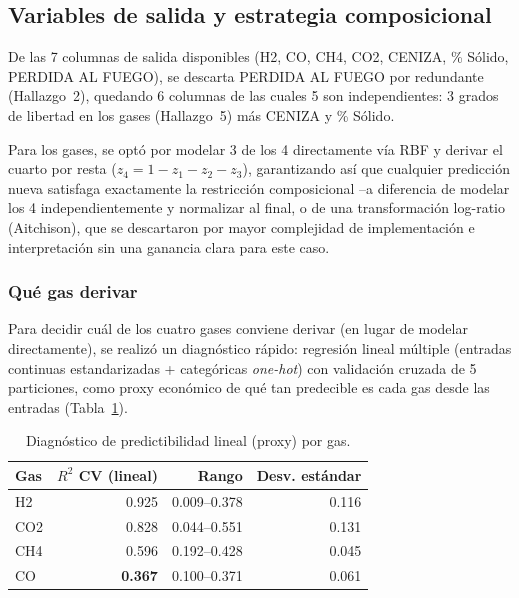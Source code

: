 \documentclass[11pt,a4paper]{article}
\begin{document}
\subsection{Variables de salida y estrategia composicional}
\label{subsec:composicional}

De las 7 columnas de salida disponibles (H2, CO, CH4, CO2, CENIZA, \%
S\'olido, PERDIDA AL FUEGO), se descarta PERDIDA AL FUEGO por redundante
(Hallazgo~2), quedando 6 columnas de las cuales 5 son independientes: 3
grados de libertad en los gases (Hallazgo~5) m\'as CENIZA y \% S\'olido.

Para los gases, se opt\'o por modelar 3 de los 4 directamente v\'ia RBF y
derivar el cuarto por resta ($z_4 = 1-z_1-z_2-z_3$), garantizando as\'i que
cualquier predicci\'on nueva satisfaga exactamente la restricci\'on
composicional --a diferencia de modelar los 4 independientemente y
normalizar al final, o de una transformaci\'on log-ratio (Aitchison), que
se descartaron por mayor complejidad de implementaci\'on e interpretaci\'on
sin una ganancia clara para este caso.

\subsubsection{Qu\'e gas derivar}

Para decidir cu\'al de los cuatro gases conviene derivar (en lugar de
modelar directamente), se realiz\'o un diagn\'ostico r\'apido: regresi\'on
lineal m\'ultiple (entradas continuas estandarizadas + categ\'oricas
\emph{one-hot}) con validaci\'on cruzada de 5 particiones, como proxy
econ\'omico de qu\'e tan predecible es cada gas desde las entradas
(Tabla~\ref{tab:diagnostico_gases}).

\begin{table}[htbp]
\centering
\caption{Diagn\'ostico de predictibilidad lineal (proxy) por gas.}
\label{tab:diagnostico_gases}
\begin{tabular}{@{}lrrr@{}}
\toprule
Gas & $R^2$ CV (lineal) & Rango & Desv. est\'andar \\
\midrule
H2  & 0.925 & 0.009--0.378 & 0.116 \\
CO2 & 0.828 & 0.044--0.551 & 0.131 \\
CH4 & 0.596 & 0.192--0.428 & 0.045 \\
CO  & \textbf{0.367} & 0.100--0.371 & 0.061 \\
\bottomrule
\end{tabular}
\end{table}
\end{document}
